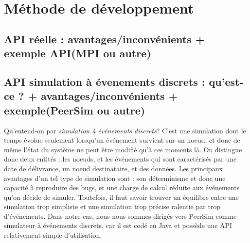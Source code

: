\documentclass{article}
\begin{document}
		\section{Méthode de développement}
			\subsection{API réelle : avantages/inconvénients + exemple API(MPI ou autre)}
			\subsection{API simulation à évenements discrets : qu'est-ce ? + avantages/inconvénients + exemple(PeerSim ou autre)}
				\large{Qu'entend-on par \textit{simulation à événements discrets}? C'est une simulation dont le temps évolue seulement lorsqu'un événement survient sur un noeud, et donc de même l'état du système ne peut être modifié qu'à ces moments là.
\newline \indent On distingue donc deux entités : les noeuds, et les événements qui sont caractérisés par une date de délivrance, un noeud destinataire, et des données.
\newline \indent Les principaux avantages d'un tel type de simulation sont : son déterminisme et donc une capacité à reproduire des bugs, et une charge de calcul réduite aux événements qu'on décide de simuler. Toutefois, il faut savoir trouver un équilibre entre une simulation trop simpliste et une simulation trop précise ralentie par trop d'événements.
\newline \indent Dans notre cas, nous nous sommes dirigés vers PeerSim comme simulateur à événements discrets, car il est codé en Java et possède une API relativement simple d'utilisation. }
			\newpage
\end{document}
